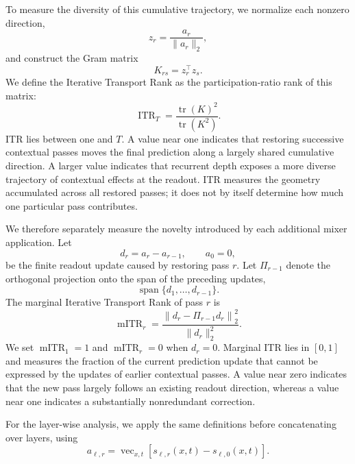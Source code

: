 \documentclass{article}
\begin{document}
To measure the diversity of this cumulative trajectory, we normalize each
nonzero direction,
\begin{equation}
z_r=\frac{a_r}{\|a_r\|_2},
\end{equation}
and construct the Gram matrix
\begin{equation}
K_{rs}=z_r^\top z_s.
\end{equation}
We define the Iterative Transport Rank as the participation-ratio rank of this
matrix:
\begin{equation}
\operatorname{ITR}_T
=\frac{\operatorname{tr}(K)^2}
{\operatorname{tr}(K^2)}.
\label{eq:itr}
\end{equation}
ITR lies between one and $T$. A value near one indicates that restoring
successive contextual passes moves the final prediction along a largely shared
cumulative direction. A larger value indicates that recurrent depth exposes a
more diverse trajectory of contextual effects at the readout. ITR measures the
geometry accumulated across all restored passes; it does not by itself
determine how much one particular pass contributes.

We therefore separately measure the novelty introduced by each additional
mixer application. Let
\begin{equation}
d_r=a_r-a_{r-1},
\qquad
a_0=0,
\end{equation}
be the finite readout update caused by restoring pass $r$. Let
$\Pi_{r-1}$ denote the orthogonal projection onto the span of the preceding
updates,
\begin{equation}
\operatorname{span}\{d_1,\ldots,d_{r-1}\}.
\end{equation}
The marginal Iterative Transport Rank of pass $r$ is
\begin{equation}
\operatorname{mITR}_r
=\frac{\left\|d_r-\Pi_{r-1}d_r\right\|_2^2}
{\|d_r\|_2^2}.
\label{eq:mitr}
\end{equation}
We set $\operatorname{mITR}_1=1$ and
$\operatorname{mITR}_r=0$ when $d_r=0$. Marginal ITR lies in $[0,1]$ and
measures the fraction of the current prediction update that cannot be expressed
by the updates of earlier contextual passes. A value near zero indicates that
the new pass largely follows an existing readout direction, whereas a value
near one indicates a substantially nonredundant correction.

For the layer-wise analysis, we apply the same definitions before
concatenating over layers, using
\begin{equation}
a_{\ell,r}
=\operatorname{vec}_{x,t}\!\left[
s_{\ell,r}(x,t)-s_{\ell,0}(x,t)
\right].
\label{eq:layerwise_readout_trajectory}
\end{equation}
\end{document}
